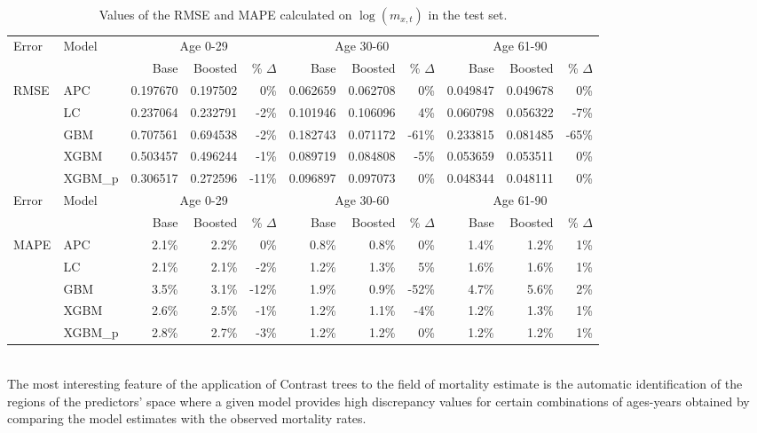 \documentclass[a4,11pt]{article}
\begin{document}
\begin{table}[ht]
\centering
\scriptsize
\begin{tabular}{|l|l|r|r|r|r|r|r|r|r|r|}
\hline
\multirow{2}{*}{Error} & \multirow{2}{*}{Model} & \multicolumn{3}{c|}{Age 0-29} & \multicolumn{3}{c|}{Age 30-60} & \multicolumn{3}{c|}{Age 61-90} \\
\cline{3-11}
&			&	Base 	&	Boosted 	& \% $\Delta$ &	Base 	&	Boosted 	& \% $\Delta$ &	Base 	&	Boosted	& \% $\Delta$\\
\hline
\multirow{5}{*}{RMSE}  & APC 		&	0.197670	&	0.197502	&	0\%		&	0.062659	&	0.062708	&	0\%	&	0.049847	&	0.049678	&	0\%	\\
& LC 		&	0.237064	&	0.232791	&	-2\%		&	0.101946	&	0.106096	&	4\%	&	0.060798	&	0.056322	&	-7\%	\\
& GBM 		&	0.707561	&	0.694538	&	-2\%		&	0.182743	&	0.071172	&	-61\%	&	0.233815	&	0.081485	&	-65\%	\\
& XGBM 		&	0.503457	&	0.496244	&	-1\%		&	0.089719	&	0.084808	&	-5\%	&	0.053659	&	0.053511	&	0\%	\\
& XGBM\_p	&	0.306517	&	0.272596	&	-11\%	&	0.096897	&	0.097073	&	0\%	&	0.048344	&	0.048111	&	0\%	\\
\hline
\multirow{2}{*}{Error} & \multirow{2}{*}{Model} & \multicolumn{3}{c|}{Age 0-29} & \multicolumn{3}{c|}{Age 30-60} & \multicolumn{3}{c|}{Age 61-90} \\
\cline{3-11}
&			&	Base 	&	Boosted 	& \% $\Delta$ &	Base 	&	Boosted 	& \% $\Delta$ &	Base 	&	Boosted	& \% $\Delta$\\
\hline
\multirow{5}{*}{MAPE}  & APC 	&	2.1\%	&	2.2\%	&	0\%		&	0.8\%	&	0.8\%	&	0\%		&	1.4\%	&	1.2\%	&	1\%	\\
& LC 		&	2.1\%	&	2.1\%	&	-2\%		&	1.2\%	&	1.3\%	&	5\%		&	1.6\%	&	1.6\%	&	1\%	\\
& GBM 		&	3.5\%	&	3.1\%	&	-12\%	&	1.9\%	&	0.9\%	&	-52\%	&	4.7\%	&	5.6\%	&	2\%	\\
& XGBM 		&	2.6\%	&	2.5\%	&	-1\%		&	1.2\%	&	1.1\%	&	-4\%		&	1.2\%	&	1.3\%	&	1\%	\\
& XGBM\_p 	&	2.8\%	&	2.7\%	&	-3\%		&	1.2\%	&	1.2\%	&	0\%		&	1.2\%	&	1.2\%	&	1\%	\\\hline
\end{tabular}
\caption{Values of the RMSE and MAPE calculated on $\log{\left(m_{x,t}\right)}$ in the test set.}
\label{tab:errors_log}
\end{table}\\
%
The most interesting feature of the application of Contrast trees to the field of mortality estimate is the automatic identification of the regions of the predictors' space where a given model provides high discrepancy values for certain combinations of ages-years obtained by comparing the model estimates with the observed mortality rates.
\end{document}

